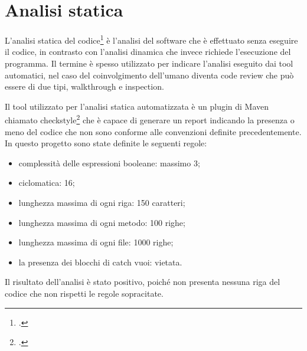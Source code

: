 \section{Analisi statica}\label{sec:analisi-statica}

L'analisi statica del codice\footcite{site:analisi_static} è l'analisi del software che è effettuato senza eseguire il codice, in contrasto con l'analisi dinamica che invece richiede l'esecuzione del programma.
Il termine è spesso utilizzato per indicare l'analisi eseguito dai tool automatici, nel caso del coinvolgimento dell'umano diventa code review che può essere di due tipi, \gls{walkthrough} e \gls{inspection}.

Il tool utilizzato per l'analisi statica automatizzata è un plugin di Maven chiamato checkstyle\footcite{site:checkstyle} che è capace di generare un report indicando la presenza o meno del codice che non sono conforme alle convenzioni definite precedentemente.
In questo progetto sono state definite le seguenti regole:
\begin{itemize}
    \item complessità delle espressioni booleane: massimo 3;
    \item \gls{ciclomatica}: 16;
    \item lunghezza massima di ogni riga: 150 caratteri;
    \item lunghezza massima di ogni metodo: 100 righe;
    \item lunghezza massima di ogni file: 1000 righe;
    \item la presenza dei blocchi di catch vuoi: vietata.
\end{itemize}

Il risultato dell'analisi è stato positivo, poiché non presenta nessuna riga del codice che non rispetti le regole sopracitate.